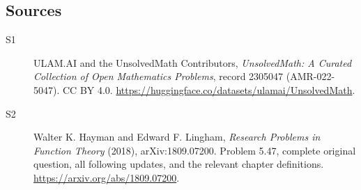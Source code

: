 \documentclass[11pt]{book}
\begin{document}
\subsection{Sources}
\begin{description}
\item[\hypertarget{source:2305047:1}{S1}] ULAM.AI and the UnsolvedMath Contributors, \emph{UnsolvedMath: A Curated Collection of Open Mathematics Problems}, record 2305047 (AMR-022-5047). CC BY 4.0. \url{https://huggingface.co/datasets/ulamai/UnsolvedMath}.
\item[\hypertarget{source:2305047:2}{S2}] Walter K. Hayman and Edward F. Lingham, \emph{Research Problems in Function Theory} (2018), arXiv:1809.07200. Problem 5.47, complete original question, all following updates, and the relevant chapter definitions. \url{https://arxiv.org/abs/1809.07200}.
\end{description}
\label{end:2305047}
\end{document}
